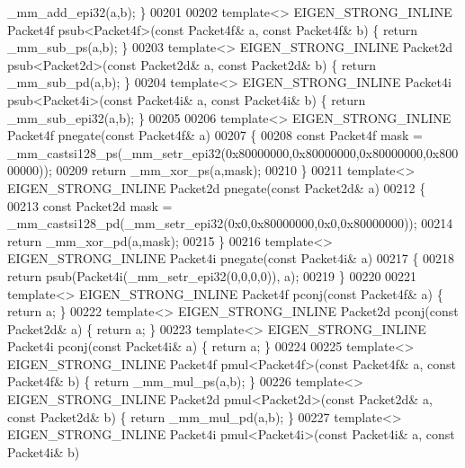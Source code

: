 \begin{DoxyCode}
      \_mm\_add\_epi32(a,b); \}
00201 
00202 \textcolor{keyword}{template}<> EIGEN\_STRONG\_INLINE Packet4f psub<Packet4f>(\textcolor{keyword}{const} Packet4f& a, \textcolor{keyword}{const} Packet4f& b) \{ \textcolor{keywordflow}{return} 
      \_mm\_sub\_ps(a,b); \}
00203 \textcolor{keyword}{template}<> EIGEN\_STRONG\_INLINE Packet2d psub<Packet2d>(\textcolor{keyword}{const} Packet2d& a, \textcolor{keyword}{const} Packet2d& b) \{ \textcolor{keywordflow}{return} 
      \_mm\_sub\_pd(a,b); \}
00204 \textcolor{keyword}{template}<> EIGEN\_STRONG\_INLINE Packet4i psub<Packet4i>(\textcolor{keyword}{const} Packet4i& a, \textcolor{keyword}{const} Packet4i& b) \{ \textcolor{keywordflow}{return} 
      \_mm\_sub\_epi32(a,b); \}
00205 
00206 \textcolor{keyword}{template}<> EIGEN\_STRONG\_INLINE Packet4f pnegate(\textcolor{keyword}{const} Packet4f& a)
00207 \{
00208   \textcolor{keyword}{const} Packet4f mask = \_mm\_castsi128\_ps(\_mm\_setr\_epi32(0x80000000,0x80000000,0x80000000,0x80000000));
00209   \textcolor{keywordflow}{return} \_mm\_xor\_ps(a,mask);
00210 \}
00211 \textcolor{keyword}{template}<> EIGEN\_STRONG\_INLINE Packet2d pnegate(\textcolor{keyword}{const} Packet2d& a)
00212 \{
00213   \textcolor{keyword}{const} Packet2d mask = \_mm\_castsi128\_pd(\_mm\_setr\_epi32(0x0,0x80000000,0x0,0x80000000));
00214   \textcolor{keywordflow}{return} \_mm\_xor\_pd(a,mask);
00215 \}
00216 \textcolor{keyword}{template}<> EIGEN\_STRONG\_INLINE Packet4i pnegate(\textcolor{keyword}{const} Packet4i& a)
00217 \{
00218   \textcolor{keywordflow}{return} psub(Packet4i(\_mm\_setr\_epi32(0,0,0,0)), a);
00219 \}
00220 
00221 \textcolor{keyword}{template}<> EIGEN\_STRONG\_INLINE Packet4f pconj(\textcolor{keyword}{const} Packet4f& a) \{ \textcolor{keywordflow}{return} a; \}
00222 \textcolor{keyword}{template}<> EIGEN\_STRONG\_INLINE Packet2d pconj(\textcolor{keyword}{const} Packet2d& a) \{ \textcolor{keywordflow}{return} a; \}
00223 \textcolor{keyword}{template}<> EIGEN\_STRONG\_INLINE Packet4i pconj(\textcolor{keyword}{const} Packet4i& a) \{ \textcolor{keywordflow}{return} a; \}
00224 
00225 \textcolor{keyword}{template}<> EIGEN\_STRONG\_INLINE Packet4f pmul<Packet4f>(\textcolor{keyword}{const} Packet4f& a, \textcolor{keyword}{const} Packet4f& b) \{ \textcolor{keywordflow}{return} 
      \_mm\_mul\_ps(a,b); \}
00226 \textcolor{keyword}{template}<> EIGEN\_STRONG\_INLINE Packet2d pmul<Packet2d>(\textcolor{keyword}{const} Packet2d& a, \textcolor{keyword}{const} Packet2d& b) \{ \textcolor{keywordflow}{return} 
      \_mm\_mul\_pd(a,b); \}
00227 \textcolor{keyword}{template}<> EIGEN\_STRONG\_INLINE Packet4i pmul<Packet4i>(\textcolor{keyword}{const} Packet4i& a, \textcolor{keyword}{const} Packet4i& b)

\end{DoxyCode}

